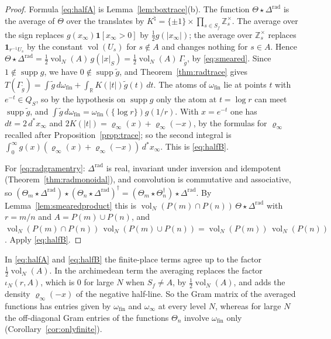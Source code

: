 \documentclass[11pt]{amsart}
\theoremstyle{definition}
\newcommand{\R}{\mathbb R}
\newcommand{\Z}{\mathbb Z}
\newcommand{\supp}{\operatorname{supp}}
\newcommand{\vol}{\operatorname{vol}}
\newcommand{\Knat}{K^{\natural}}
\begin{document}
\begin{proof}
Formula \eqref{eq:halfA} is Lemma~\ref{lem:boxtrace}(b). The function
$\Theta\star\Delta^{\mathrm{rad}}$ is the average of $\Theta$ over the translates
by $\Knat=\{\pm1\}\times\prod_{s\in S_f}\Z_s^\times$. The average over the
sign replaces $g(x_\infty)\mathbf 1[x_\infty>0]$ by $\tfrac12g(|x_\infty|)$;
the average over $\Z_s^\times$ replaces $\mathbf 1_{r^{-1}U_s}$ by the
constant $\vol(U_s)$ for $s\notin A$ and changes nothing for $s\in A$. Hence
$\Theta\star\Delta^{\mathrm{rad}}=\tfrac12\vol_N(A)\,g(|x|_S)
=\tfrac12\vol_N(A)\,\Gamma_{\tilde g}$, by \eqref{eq:smeared}. Since
$1\notin\supp g$, we have $0\notin\supp\tilde g$, and
Theorem~\ref{thm:radtrace} gives
$T(\Gamma_{\tilde g})=\int\tilde g\,d\omega_{\mathrm{fin}}
+\int_\R K(|t|)\tilde g(t)\,dt$. The atoms of $\omega_{\mathrm{fin}}$ lie at
points $t$ with $e^{-t}\in Q_S$, so by the hypothesis on $\supp g$ only the
atom at $t=\log r$ can meet $\supp\tilde g$, and
$\int\tilde g\,d\omega_{\mathrm{fin}}
=\omega_{\mathrm{fin}}(\{\log r\})g(1/r)$. With $x=e^{-t}$ one has
$dt=2\,d^*x_\infty$ and $2K(|t|)=\varrho_\infty(x)+\varrho_\infty(-x)$, by the
formulas for $\varrho_\infty$ recalled after Proposition~\ref{prop:trace}; so
the second integral is
$\int_0^\infty g(x)(\varrho_\infty(x)+\varrho_\infty(-x))\,d^*x_\infty$. This is
\eqref{eq:halfB}.

For \eqref{eq:radgramentry}: $\Delta^{\mathrm{rad}}$ is real, invariant under
inversion and idempotent (Theorem~\ref{thm:radmonoidal}), and convolution is
commutative and associative, so
$(\Theta_m\star\Delta^{\mathrm{rad}})\star(\Theta_n\star\Delta^{\mathrm{rad}})^\dagger
=(\Theta_m\star\Theta_n^\dagger)\star\Delta^{\mathrm{rad}}$. By
Lemma~\ref{lem:smearedproduct} this is
$\vol_N(P(m)\cap P(n))\,\Theta\star\Delta^{\mathrm{rad}}$ with $r=m/n$ and
$A=P(m)\cup P(n)$, and
$\vol_N(P(m)\cap P(n))\,\vol_N(P(m)\cup P(n))=\vol_N(P(m))\,\vol_N(P(n))$. Apply
\eqref{eq:halfB}.
\end{proof}

In \eqref{eq:halfA} and \eqref{eq:halfB} the finite-place terms agree up to
the factor $\tfrac12\vol_N(A)$. In the archimedean term the averaging replaces
the factor $\iota_N(r,A)$, which is $0$ for large $N$ when $S_f\ne A$, by
$\tfrac12\vol_N(A)$, and adds the density $\varrho_\infty(-x)$ of the negative
half-line. So the Gram matrix of the averaged functions has entries given by
$\omega_{\mathrm{fin}}$ and $\omega_\infty$ at every level $N$, whereas for
large $N$ the off-diagonal Gram entries of the functions $\Theta_n$ involve
$\omega_{\mathrm{fin}}$ only (Corollary~\ref{cor:onlyfinite}).
\end{document}
